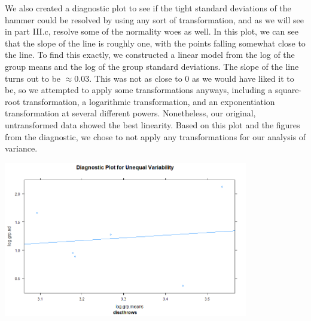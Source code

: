 \documentclass[letter,12pt]{article}
\begin{document}
  We also created a diagnostic plot to see if the tight standard deviations of the hammer could be resolved by using any sort of transformation, and as we will see in part III.c, resolve some of the normality woes as well. In this plot, we can see that the slope of the line is roughly one, with the points falling somewhat close to the line. To find this exactly, we constructed a linear model from the log of the group means and the log of the group standard deviations. The slope of the line turns out to be $\approx 0.03$. This was not as close to 0 as we would have liked it to be, so we attempted to apply some transformations anyways, including a square-root transformation, a logarithmic transformation, and an exponentiation transformation at several different powers. Nonetheless, our original, untransformed data showed the best linearity. Based on this plot and the figures from the diagnostic, we chose to not apply any transformations for our analysis of variance.\par
  \begin{center}
    \includegraphics[width=0.8\textwidth]{diagplot.png}
  \end{center}
	
\end{document}
